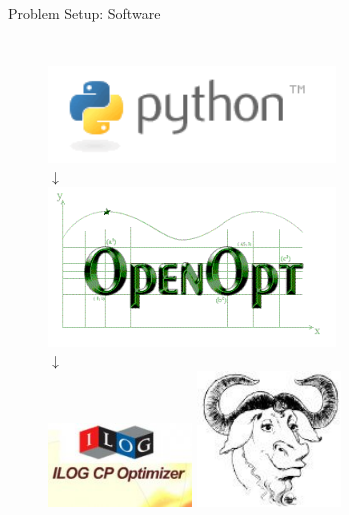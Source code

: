 \documentclass[xcolor=pdflatex,dvipsnames,table]{beamer}
\begin{document}
\begin{frame}[fragile]{Problem Setup: Software}
\begin{columns}
\begin{figure}
\includegraphics[width=0.8\textwidth]{figures/python.png}\\
$\downarrow$\\
\includegraphics[width=0.8\textwidth]{figures/openopt.png}\\
$\downarrow$\\
\includegraphics[width=0.4\textwidth]{figures/cplex.png}
\includegraphics[width=0.4\textwidth]{figures/gnu-head-sm.jpg}
\end{figure}
\end{columns}
\end{frame}
\end{document}
